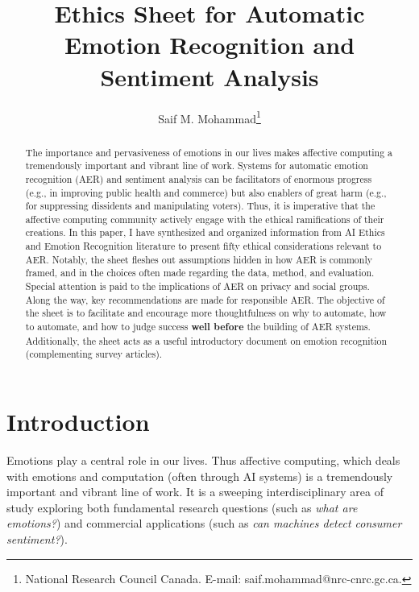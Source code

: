 \documentclass{clv3}
\begin{document}
\title{Ethics Sheet for Automatic Emotion Recognition and Sentiment Analysis}

\author{Saif M. Mohammad\thanks{National Research Council Canada. E-mail: saif.mohammad@nrc-cnrc.gc.ca.}}


\maketitle

\begin{abstract}
The importance and pervasiveness of emotions in our lives makes affective computing a tremendously important and vibrant line of work. Systems for automatic emotion recognition (AER) and sentiment analysis can be facilitators of enormous progress (e.g., in improving public health and commerce) but also enablers of great harm (e.g., for suppressing dissidents and manipulating voters). Thus, it is imperative that the affective computing community actively engage with the ethical ramifications of their creations. In this paper, I have synthesized and organized information from AI Ethics and Emotion Recognition literature to present fifty ethical considerations relevant to AER. Notably, the sheet fleshes out assumptions hidden in how AER is commonly framed, and in the choices often made regarding the data, method, and evaluation. Special attention is paid to the implications of AER  on privacy and social groups. Along the way, key recommendations are made for responsible AER. The objective of the sheet is to facilitate and encourage more thoughtfulness on why to automate, how to automate, and how to judge success \textbf{well before} the building of AER systems. Additionally, the sheet acts as a useful introductory document on emotion recognition  (complementing survey articles).
\end{abstract}


\section{Introduction}

Emotions play a central role in our lives. 
Thus affective computing, which deals with emotions and computation (often through AI systems) is a  tremendously important and vibrant line of work. It is a sweeping interdisciplinary area of study exploring both fundamental research questions (such as \textit{what are emotions?}) and commercial applications (such as \textit{can machines detect consumer sentiment?}).
\end{document}
